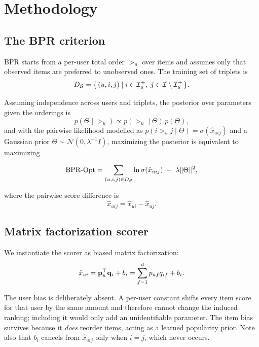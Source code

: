 \section{Methodology}
\label{sec:methodology}

\subsection{The BPR criterion}

BPR starts from a per-user total order $>_u$ over items and assumes only that
observed items are preferred to unobserved ones. The training set of triplets
is
\begin{equation}
  D_{\mathcal{S}} = \{\, (u, i, j) \mid i \in \mathcal{I}_u^{+},\; j \in \mathcal{I} \setminus \mathcal{I}_u^{+} \,\} .
\end{equation}

Assuming independence across users and triplets, the posterior over
parameters given the orderings is
\begin{equation}
  p(\Theta \mid >_u) \propto p(>_u \mid \Theta)\, p(\Theta) ,
\end{equation}
and with the pairwise likelihood modelled as
$p(i >_u j \mid \Theta) = \sigma(\hat{x}_{uij})$ and a Gaussian prior
$\Theta \sim \mathcal{N}(0, \lambda^{-1} I)$, maximizing the posterior is
equivalent to maximizing

\begin{equation}
  \mathrm{BPR\text{-}Opt}
  = \sum_{(u,i,j) \in D_{\mathcal{S}}} \ln \sigma(\hat{x}_{uij})
    \;-\; \lambda \lVert \Theta \rVert^{2} ,
  \label{eq:bpropt}
\end{equation}

where the pairwise score difference is
\begin{equation}
  \hat{x}_{uij} = \hat{x}_{ui} - \hat{x}_{uj} .
\end{equation}

\subsection{Matrix factorization scorer}

We instantiate the scorer as biased matrix factorization:
\begin{equation}
  \hat{x}_{ui} = \mathbf{p}_u^{\top} \mathbf{q}_i + b_i
  = \sum_{f=1}^{d} p_{uf} q_{if} + b_i .
  \label{eq:mf}
\end{equation}

The user bias is deliberately absent. A per-user constant shifts every item
score for that user by the same amount and therefore cannot change the
induced ranking; including it would only add an unidentifiable parameter.
The item bias survives because it \emph{does} reorder items, acting as a
learned popularity prior. Note also that $b_i$ cancels from
$\hat{x}_{uij}$ only when $i = j$, which never occurs.

